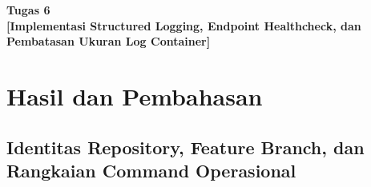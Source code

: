\documentclass[a4paper,oneside,11pt]{book}
\newcommand{\Pertemuan}{6}
\newcommand{\Materi}{Implementasi Structured Logging, Endpoint Healthcheck, dan Pembatasan Ukuran Log Container}
\begin{document}


\renewcommand{\cfttoctitlefont}{\hfill\normalfont\LARGE\bfseries}
\renewcommand{\cftaftertoctitle}{\hfill}
\renewcommand{\cftbeforetoctitleskip}{1em}
\renewcommand{\cftaftertoctitleskip}{1.5em}

\renewcommand{\cftchappresnum}{Bab~}
\renewcommand{\cftchapaftersnum}{.}
\renewcommand{\cftchapnumwidth}{3.5em}
\renewcommand{\cftchapfont}{\bfseries}
\renewcommand{\cftchappagefont}{\bfseries}

\setlength{\cftbeforechapskip}{0.8em} %
\setlength{\cftbeforesecskip}{0.2em}  %
\renewcommand{\cftsecfont}{\normalfont}
\renewcommand{\cftsubsecfont}{\normalfont}

\renewcommand{\contentsname}{\centering Daftar Isi}
\renewcommand{\listfigurename}{\centering Daftar Gambar}
\renewcommand{\lstlistlistingname}{\centering Daftar Kode}

\renewcommand{\cftloftitlefont}{\hfill\normalfont\LARGE\bfseries}
\renewcommand{\cftafterloftitle}{\hfill}

\tableofcontents

\newpage
\listoffigures

\newpage
\lstlistoflistings

\newpage
\begin{center}
  \textbf{\LARGE Tugas \Pertemuan\\
  {[{\Materi}]}}
\end{center}

\section{Hasil dan Pembahasan}

\subsection{Identitas Repository, Feature Branch, dan Rangkaian Command Operasional}
\end{document}
